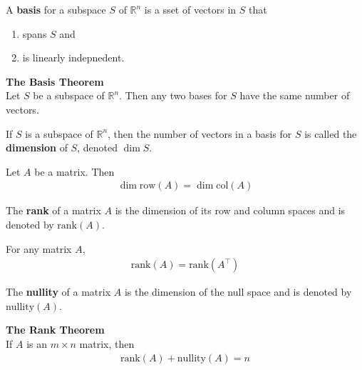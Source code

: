 \documentclass{article}
\begin{document}
\begin{definition}
    A \textbf{basis} for a subspace $S$ of $\mathbb{R}^n$ is a sset of vectors in $S$ that
    \begin{enumerate}
        \item spans $S$ and
        \item is linearly indepnedent.
    \end{enumerate}
\end{definition}
\begin{theorem}
    \textbf{The Basis Theorem}\\
    Let $S$ be a subspace of $\mathbb{R}^n$. Then any two bases for $S$ have the same number of vectors.
\end{theorem}
\begin{definition}
    If $S$ is a subspace of $\mathbb{R}^n$, then the number of vectors in a basis for $S$ is called the \textbf{dimension} of $S$, denoted $\dim S$.
\end{definition}
\begin{theorem}
    Let $A$ be a matrix. Then
    \begin{gather*}
        \dim \text{row}(A) = \dim \text{col}(A)
    \end{gather*}
\end{theorem}
\begin{definition}
    The \textbf{rank} of a matrix $A$ is the dimension of its row and column spaces and is denoted by $\text{rank}(A)$.
\end{definition}
\begin{theorem}
    For any matrix $A$,
    \begin{gather*}
        \text{rank}(A) = \text{rank}(A^\intercal)
    \end{gather*}
\end{theorem}
\begin{definition}
    The \textbf{nullity} of a matrix $A$ is the dimension of the null space and is denoted by $\text{nullity}(A)$.
\end{definition}
\begin{theorem}
    \textbf{The Rank Theorem}\\
    If $A$ is an $m\times n$ matrix, then
    \begin{gather*}
        \text{rank}(A) + \text{nullity}(A) = n
    \end{gather*}
\end{theorem}
\end{document}
